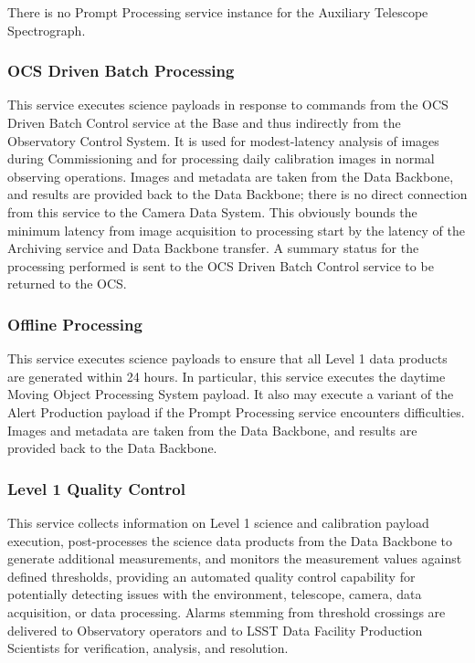 \documentclass[]{article}
\begin{document}
There is no Prompt Processing service instance for the Auxiliary
Telescope Spectrograph.

\subsubsection{OCS Driven Batch
Processing}\label{ocs-driven-batch-processing}

This service executes science payloads in response to commands from the
OCS Driven Batch Control service at the Base and thus indirectly from
the Observatory Control System. It is used for modest-latency analysis
of images during Commissioning and for processing daily calibration
images in normal observing operations. Images and metadata are taken
from the Data Backbone, and results are provided back to the Data
Backbone; there is no direct connection from this service to the Camera
Data System. This obviously bounds the minimum latency from image
acquisition to processing start by the latency of the Archiving service
and Data Backbone transfer. A summary status for the processing
performed is sent to the OCS Driven Batch Control service to be returned
to the OCS.

\subsubsection{Offline Processing}\label{offline-processing}

This service executes science payloads to ensure that all Level 1 data
products are generated within 24 hours. In particular, this service
executes the daytime Moving Object Processing System payload. It also
may execute a variant of the Alert Production payload if the Prompt
Processing service encounters difficulties. Images and metadata are
taken from the Data Backbone, and results are provided back to the Data
Backbone.

\subsubsection{Level 1 Quality Control}\label{level-1-quality-control}

This service collects information on Level 1 science and calibration
payload execution, post-processes the science data products from the
Data Backbone to generate additional measurements, and monitors the
measurement values against defined thresholds, providing an automated
quality control capability for potentially detecting issues with the
environment, telescope, camera, data acquisition, or data processing.
Alarms stemming from threshold crossings are delivered to Observatory
operators and to LSST Data Facility Production Scientists for
verification, analysis, and resolution.
\end{document}
